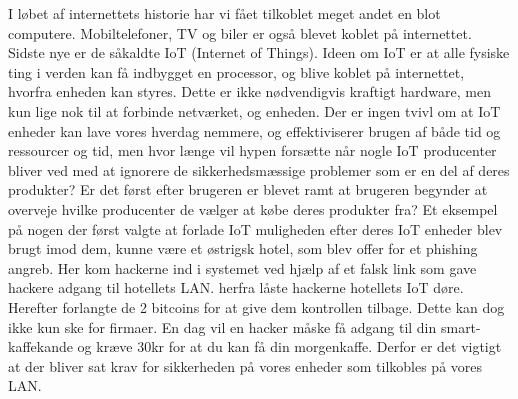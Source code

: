    I løbet af internettets historie har vi fået tilkoblet meget andet en blot computere. Mobiltelefoner, TV og biler er også blevet koblet på internettet. Sidste nye er de såkaldte IoT (Internet of Things). Ideen om IoT er at alle fysiske ting i verden kan få indbygget en processor, og blive koblet på internettet, hvorfra enheden kan styres. Dette er ikke nødvendigvis kraftigt hardware, men kun lige nok til at forbinde netværket, og enheden. Der er ingen tvivl om at IoT enheder kan lave vores hverdag nemmere, og effektiviserer brugen af både tid og ressourcer og tid, men hvor længe vil hypen forsætte når nogle IoT producenter bliver ved med at ignorere de sikkerhedsmæssige problemer som er en del af deres produkter? Er det først efter brugeren er blevet ramt at brugeren begynder at overveje hvilke producenter de vælger at købe deres produkter fra? Et eksempel på nogen der først valgte at forlade IoT muligheden efter deres IoT enheder blev brugt imod dem, kunne være et østrigsk hotel, som blev offer for et phishing  angreb. Her kom hackerne ind i systemet ved hjælp af et falsk link som gave hackere adgang til hotellets LAN. herfra låste hackerne hotellets IoT døre. Herefter forlangte de 2 bitcoins for at give dem kontrollen tilbage. Dette kan dog ikke kun ske for firmaer. En dag vil en hacker måske få adgang til din smart-kaffekande og kræve 30kr for at du kan få din morgenkaffe. Derfor er det vigtigt at der bliver sat krav for sikkerheden på vores enheder som tilkobles på vores LAN.\\
   
    


\newpage